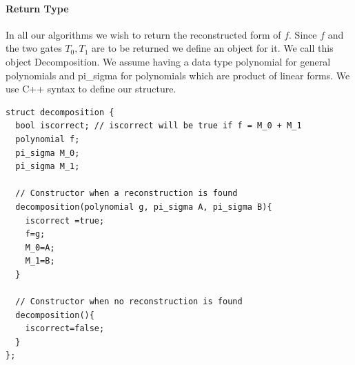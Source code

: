 \documentclass[letterpaper,USenglish,numberwithinsect]{lipics}
\newcommand{\F}{\mathbb{F}}
\begin{document}
\begin{framed}
\paragraph{Return Type}
In all our algorithms we wish to return the reconstructed form of $f$. Since $f$ and the two gates $T_0,T_1$ are to be returned we define an
object for it. We call this object Decomposition. We assume having a data type polynomial for general polynomials and pi\_sigma for polynomials
which are product of linear forms. We use C++ syntax to define our structure.
\begin{lstlisting}
struct decomposition {
  bool iscorrect; // iscorrect will be true if f = M_0 + M_1
  polynomial f;
  pi_sigma M_0;
  pi_sigma M_1;

  // Constructor when a reconstruction is found
  decomposition(polynomial g, pi_sigma A, pi_sigma B){
    iscorrect =true;
    f=g;
    M_0=A;
    M_1=B;
  }

  // Constructor when no reconstruction is found
  decomposition(){
    iscorrect=false;
  }
};
\end{lstlisting}
\end{framed}






\end{document}
